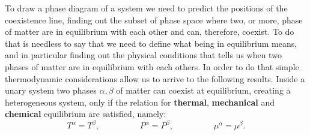 To draw a phase diagram of a system we need to predict the positions of the coexistence line, finding out the subset of phase space where two, or more, phase of matter are in equilibrium with each other and can, therefore, coexist. To do that is needless to say that we need to define what being in equilibrium means, and in particular finding out the physical conditions that tells us when two phases of matter are in equilibrium with each others. In order to do that simple thermodynamic considerations allow us to arrive to the following results.
{
    Inside a unary system two phases $\alpha, \beta$ of matter can coexist at equilibrium, creating a heterogeneous system, only if the relation for \textbf{thermal}, \textbf{mechanical} and \textbf{chemical} equilibrium are satisfied, namely:
    \begin{equation}
        \label{eq:equiCond}
        T^\alpha = T^\beta, \hspace{2cm} P^\alpha = P^\beta, \hspace{2cm} \mu^\alpha = \mu^\beta.
    \end{equation}
}
